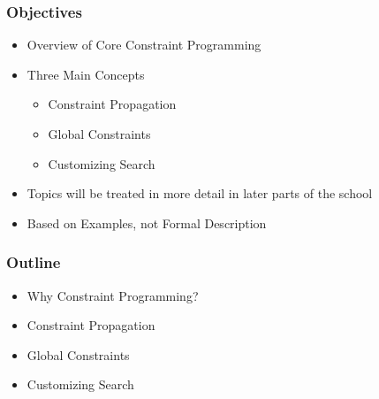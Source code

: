 \begin{frame}
\frametitle{Objectives}
\begin{itemize}
\item Overview of Core Constraint Programming
\item Three Main Concepts
\begin{itemize}
\item Constraint Propagation
\item Global Constraints
\item Customizing Search
\end{itemize}
\item Topics will be treated in more detail in later parts of the school
\item Based on Examples, not Formal Description
\end{itemize}
\end{frame}

\begin{frame}
\frametitle{Outline}
\begin{itemize}
\item Why Constraint Programming?
\item Constraint Propagation
\item Global Constraints
\item Customizing Search
\end{itemize}
\end{frame}



